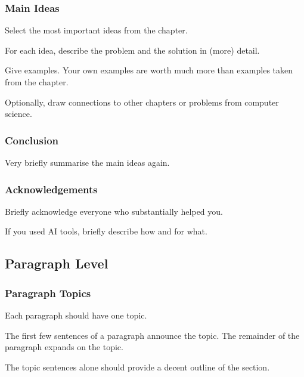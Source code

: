 \documentclass[xetex]{beamer}
\begin{document}
\begin{frame}
  \frametitle{Main Ideas}

  Select the most important ideas from the chapter.

  \medskip
  \pause

  For each idea, describe the problem and the solution in (more) detail.

  \medskip
  \pause

  Give examples. Your own examples are worth much more than examples taken from the chapter.

  \medskip
  \pause

  Optionally, draw connections to other chapters or problems from computer science.
\end{frame}

\begin{frame}
  \frametitle{Conclusion}

  Very briefly summarise the main ideas again.
\end{frame}

\begin{frame}
  \frametitle{Acknowledgements}

  Briefly acknowledge everyone who substantially helped you.

  \medskip

  If you used AI tools, briefly describe how and for what.
\end{frame}

\subsection{Paragraph Level}

\begin{frame}
  \frametitle{Paragraph Topics}

  Each paragraph should have one topic.

  \medskip

  The first few sentences of a paragraph announce the topic.
  The remainder of the paragraph expands on the topic.

  \medskip

  The topic sentences alone should provide a decent outline of the section.
\end{frame}
\end{document}
